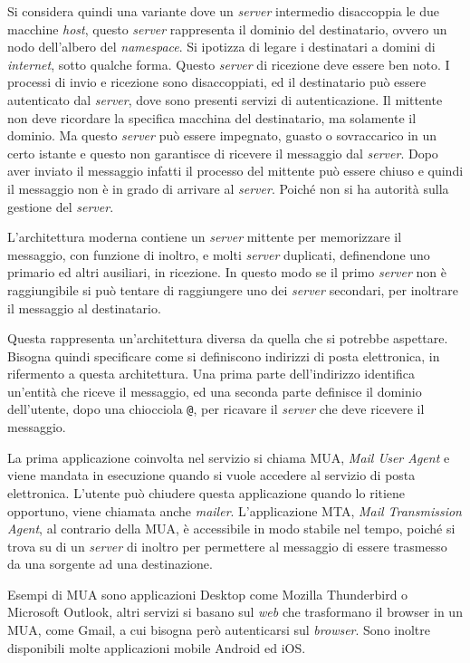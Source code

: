 \documentclass{article}
\numberwithin{equation}{subsection}
\begin{document}
Si considera quindi una variante dove un \textit{server} intermedio disaccoppia le due macchine \textit{host}, questo \textit{server} rappresenta il dominio del destinatario, ovvero un nodo dell'albero del \textit{namespace}. 
Si ipotizza di legare i destinatari a domini di \textit{internet}, sotto qualche forma. Questo \textit{server} di ricezione deve essere ben noto. 
I processi di invio e ricezione sono disaccoppiati, ed il destinatario può essere autenticato dal \textit{server}, dove sono presenti servizi di autenticazione. Il mittente non deve ricordare la specifica macchina del destinatario, ma solamente il dominio. 
Ma questo \textit{server} può essere impegnato, guasto o sovraccarico in un certo istante e questo non garantisce di ricevere il messaggio dal \textit{server}. Dopo aver inviato il messaggio infatti il processo del mittente può essere chiuso e quindi il messaggio non è in grado di arrivare al \textit{server}. Poiché non si ha autorità sulla gestione del \textit{server}. 

L'architettura moderna contiene un \textit{server} mittente per memorizzare il messaggio, con funzione di inoltro, e molti \textit{server} duplicati, definendone uno primario ed altri 
ausiliari, in ricezione. In questo modo se il primo \textit{server} non è raggiungibile si può tentare di raggiungere uno dei \textit{server} secondari, per inoltrare il messaggio al destinatario. 

Questa rappresenta un'architettura diversa da quella che si potrebbe aspettare. Bisogna quindi specificare come si definiscono indirizzi di posta elettronica, in rifermento a questa architettura. Una prima parte dell'indirizzo identifica un'entità che riceve il messaggio, ed una seconda parte definisce il dominio dell'utente, dopo una chiocciola \verb|@|, per ricavare il \textit{server} che deve ricevere il messaggio. 

La prima applicazione coinvolta nel servizio si chiama MUA, \textit{Mail User Agent} e viene mandata in esecuzione quando si vuole accedere al servizio di posta elettronica. L'utente può chiudere questa applicazione quando lo ritiene opportuno, viene chiamata anche \textit{mailer}. 
L'applicazione MTA, \textit{Mail Transmission Agent}, al contrario della MUA, è accessibile in modo stabile nel tempo, poiché si trova su di un \textit{server} di inoltro per permettere al messaggio di essere trasmesso da una sorgente ad una destinazione. 

Esempi di MUA sono applicazioni Desktop come Mozilla Thunderbird o Microsoft Outlook, altri servizi si basano sul \textit{web} che trasformano il browser in un MUA, come Gmail, a cui bisogna però autenticarsi sul \textit{browser}. Sono inoltre disponibili molte applicazioni mobile Android ed iOS. 
\end{document}

